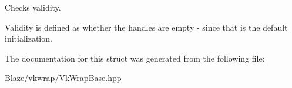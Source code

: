 Checks validity. 

Validity is defined as whether the handles are empty -\/ since that is the default initialization. 

The documentation for this struct was generated from the following file\+:\begin{DoxyCompactItemize}
\item 
Blaze/vkwrap/Vk\+Wrap\+Base.\+hpp\end{DoxyCompactItemize}
